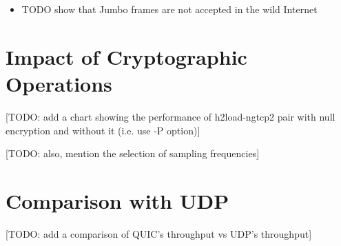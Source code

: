 \documentclass[12pt,a4paper,twoside,openright]{report}
\begin{document}
\begin{itemize}
\begin{table}[ht]
    \centering
    \caption{Impact of Jumbo frames on the throughput of \texttt{ngtcp2} Completion time required to transfer specified files. In particular, this experiment measures QUIC throughput between the server and the client when they are pinned to two different cores on the same machine, and their packets travel via an intermediate machine (as demonstrated in Figure~\ref{fig:Physical_testing_environment}).
    Furthermore, a server uses a single thread, only a single stream is used, and a single file transfer is performed for each experiment.
    }
    \label{fig:Impact_of_Jumbo_frames_for_ngtcp2_throughput}
\end{table}






























  
  
  
  \item TODO show that Jumbo frames are not accepted in the wild Internet
\end{itemize}






\section{Impact of Cryptographic Operations}



[TODO: add a chart showing the performance of h2load-ngtcp2 pair with null encryption and without it (i.e. use -P option)]

[TODO: also, mention the selection of sampling frequencies]


\section{Comparison with UDP}
[TODO: add a comparison of QUIC's throughput vs UDP's throughput]
\end{document}
